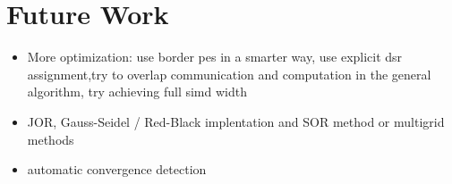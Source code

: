 \chapter{Future Work}
\begin{itemize}
    \item More optimization: use border \acp{pe} in a smarter way, use explicit \ac{dsr} assignment,try to overlap communication and computation in the general algorithm, try achieving full simd width
    \item JOR, Gauss-Seidel / Red-Black implentation and SOR method or multigrid methods
    \item automatic convergence detection
\end{itemize} 